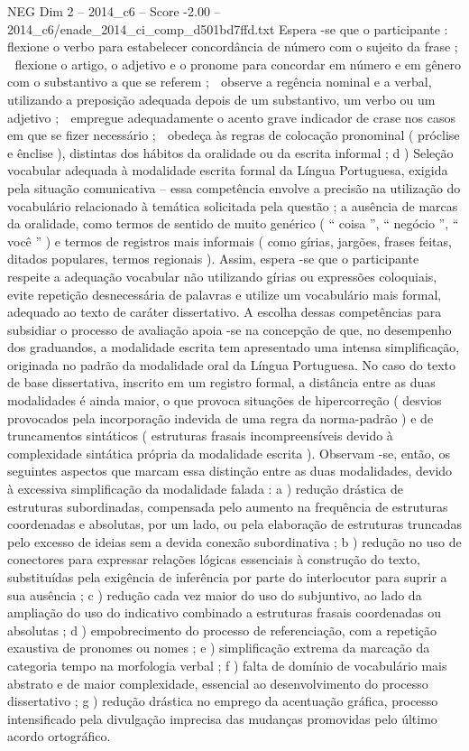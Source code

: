 \begin{textsample}{NEG Dim 2 – 2014\_c6 – Score -2.00 – 2014\_c6/enade\_2014\_ci\_comp\_d501bd7ffd.txt}
Espera -se que o participante :  flexione o verbo para estabelecer concordância de número com o sujeito da frase ;  flexione o artigo, o adjetivo e o pronome para concordar em número e em gênero com o substantivo a que se referem ;  observe a regência nominal e a verbal, utilizando a preposição adequada depois de um substantivo, um verbo ou um adjetivo ;  empregue adequadamente o acento grave indicador de crase nos casos em que se fizer necessário ;  obedeça às regras de colocação pronominal ( próclise e ênclise ), distintas dos hábitos da oralidade ou da escrita informal ; d ) Seleção vocabular adequada à modalidade escrita formal da Língua Portuguesa, exigida pela situação comunicativa – essa competência envolve a precisão na utilização do vocabulário relacionado à temática solicitada pela questão ; a ausência de marcas da oralidade, como termos de sentido de muito genérico ( “ coisa ”, “ negócio ”, “ você ” ) e termos de registros mais informais ( como gírias, jargões, frases feitas, ditados populares, termos regionais ).
Assim, espera -se que o participante respeite a adequação vocabular não utilizando gírias ou expressões coloquiais, evite repetição desnecessária de palavras e utilize um vocabulário mais formal, adequado ao texto de caráter dissertativo.
A escolha dessas competências para subsidiar o processo de avaliação apoia -se na concepção de que, no desempenho dos graduandos, a modalidade escrita tem apresentado uma intensa simplificação, originada no padrão da modalidade oral da Língua Portuguesa.
No caso do texto de base dissertativa, inscrito em um registro formal, a distância entre as duas modalidades é ainda maior, o que provoca situações de hipercorreção ( desvios provocados pela incorporação indevida de uma regra da norma-padrão ) e de truncamentos sintáticos ( estruturas frasais incompreensíveis devido à complexidade sintática própria da modalidade escrita ).
Observam -se, então, os seguintes aspectos que marcam essa distinção entre as duas modalidades, devido à excessiva simplificação da modalidade falada : a ) redução drástica de estruturas subordinadas, compensada pelo aumento na frequência de estruturas coordenadas e absolutas, por um lado, ou pela elaboração de estruturas truncadas pelo excesso de ideias sem a devida conexão subordinativa ; b ) redução no uso de conectores para expressar relações lógicas essenciais à construção do texto, substituídas pela exigência de inferência por parte do interlocutor para suprir a sua ausência ; c ) redução cada vez maior do uso do subjuntivo, ao lado da ampliação do uso do indicativo combinado a estruturas frasais coordenadas ou absolutas ; d ) empobrecimento do processo de referenciação, com a repetição exaustiva de pronomes ou nomes ; e ) simplificação extrema da marcação da categoria tempo na morfologia verbal ; f ) falta de domínio de vocabulário mais abstrato e de maior complexidade, essencial ao desenvolvimento do processo dissertativo ; g ) redução drástica no emprego da acentuação gráfica, processo intensificado pela divulgação imprecisa das mudanças promovidas pelo último acordo ortográfico.

\end{textsample}

